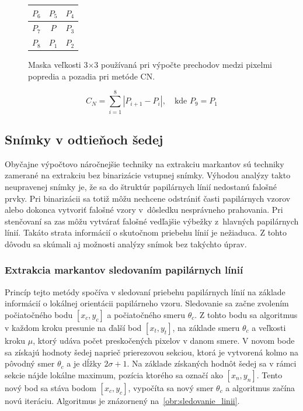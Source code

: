   \begin{figure}[h]
    \centering
      \begin{tabular}{ | l | c | r | }
        \hline
        $P_6$ & $P_5$ & $P_4$ \\ \hline
        $P_7$ & $P$ & $P_3$ \\ \hline
        $P_8$ & $P_1$ & $P_2$ \\
        \hline
      \end{tabular}
    \caption{Maska veľkosti $3$$\times{}$$3$ používaná pri výpočte prechodov medzi pixelmi popredia a pozadia pri metóde CN.}
    \label{obr:maska_CN}
  \end{figure}

  \begin{equation}
    C_N = \sum_{i=1}^{8} | P_{i+1} - P_{i} |, \quad\text{kde } P_9 = P_1
    \label{rov:crossing_number}
  \end{equation}

  \subsection{Snímky v odtieňoch šedej}
  Obyčajne výpočtovo náročnejšie techniky na extrakciu markantov sú techniky zamerané na extrakciu bez binarizácie vstupnej snímky. Výhodou analýzy
  takto neupravenej snímky je, že sa do štruktúr papilárnych línií nedostanú falošné prvky. Pri binarizácii sa totiž môžu nechcene odstrániť časti
  papilárnych vzorov alebo dokonca vytvoriť falošné vzory v~dôsledku nesprávneho prahovania. Pri stenčovaní sa zas môžu vytvárať falošné vedľajšie výbežky
  z~hlavných papilárnych línií. Takáto strata informácií o skutočnom priebehu línií je nežiaduca. Z tohto dôvodu sa skúmali aj možnosti analýzy snímok bez
  takýchto úprav.

  \subsubsection*{Extrakcia markantov sledovaním papilárnych línií}
  Princíp tejto metódy spočíva v sledovaní priebehu papilárnych línií na základe informácií o lokálnej orientácii papilárneho vzoru. Sledovanie sa začne
  zvolením počiatočného bodu $[x_c, y_c]$ a počiatočného smeru $\theta{}_c$. Z tohto bodu sa algoritmus v každom kroku presunie na ďalší bod $[x_t, y_t]$,
  na základe smeru $\theta{}_c$ a veľkosti kroku $\mu$, ktorý udáva počet preskočených pixelov v danom smere. V novom bode sa získajú hodnoty šedej
  naprieč prierezovou sekciou, ktorá je vytvorená kolmo na pôvodný smer $\theta{}_c$ a je dĺžky $2\sigma + 1$. Na základe získaných hodnôt šedej sa
  v rámci sekcie nájde lokálne maximum, pozícia ktorého sa označí ako $[x_n, y_n]$. Tento nový bod sa stáva bodom $[x_c, y_c]$,
  vypočíta sa nový smer $\theta{}_c$ a algoritmus začína novú iteráciu. Algoritmus je znázornený na~{\ref{obr:sledovanie_linii}}.

